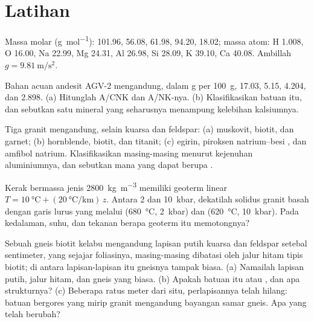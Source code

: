 \section{Latihan}\label{sec:b2:crustal-melting:exercises}

Massa molar (\unit{\gram\per\mole}):  101.96,  56.08,  61.98,
 94.20,  18.02; massa atom: H 1.008, O 16.00, Na 22.99, Mg 24.31,
Al 26.98, Si 28.09, K 39.10, Ca 40.08. Ambillah $g = \qty{9.81}{\metre\per\second\squared}$.

\begin{exercise}[$\star$]\label{exo:b2:crustal-melting:1}
Bahan acuan andesit AGV-2 mengandung, dalam \unit{\gram} per \qty{100}{\gram},
 17.03,  5.15,  4.204, dan  2.898.
(a) Hitunglah A/CNK dan A/NK-nya. (b) Klasifikasikan batuan itu, dan sebutkan satu mineral yang seharusnya menampung
kelebihan kalsiumnya.
\end{exercise}

\begin{exercise}[$\star$]\label{exo:b2:crustal-melting:2}
Tiga granit mengandung, selain kuarsa dan feldspar: (a) muskovit, biotit, dan garnet;
(b) hornblende, biotit, dan titanit; (c) egirin, piroksen natrium--besi
, dan amfibol natrium. Klasifikasikan masing-masing menurut kejenuhan aluminiumnya, dan sebutkan
mana yang dapat berupa .
\end{exercise}

\begin{exercise}[$\star$]\label{exo:b2:crustal-melting:3}
Kerak bermassa jenis \qty{2800}{\kilogram\per\cubic\metre} memiliki geoterm linear
$T = \qty{10}{\celsius} + (\qty{20}{\celsius\per\kilo\metre})\,z$. Antara 2 dan
\qty{10}{kbar}, dekatilah solidus granit basah dengan garis lurus yang melalui
(\qty{680}{\celsius}, \qty{2}{kbar}) dan (\qty{620}{\celsius}, \qty{10}{kbar}). Pada kedalaman,
suhu, dan tekanan berapa geoterm itu memotongnya?
\end{exercise}

\begin{exercise}[$\star$]\label{exo:b2:crustal-melting:4}
Sebuah gneis biotit kelabu mengandung lapisan putih kuarsa dan feldspar setebal sentimeter, yang sejajar
foliasinya, masing-masing dibatasi oleh jalur hitam tipis biotit; di antara lapisan-lapisan itu
gneisnya tampak biasa. (a) Namailah lapisan putih, jalur hitam, dan gneis yang biasa.
(b) Apakah batuan itu  atau , dan apa strukturnya? (c) Beberapa ratus
meter dari situ, perlapisannya telah hilang: batuan bergores yang mirip granit mengandung bayangan samar
gneis. Apa yang telah berubah?
\end{exercise}

